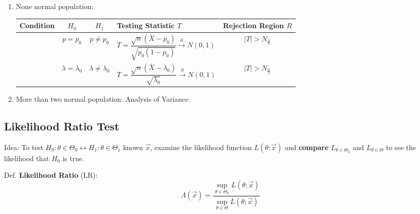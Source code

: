 \begin{enumerate}
\begin{table}[htbp]
\begin{tabularx}{\linewidth}{|c|c|c|Y|c|}
                &$\sigma_1^2\geq\sigma_2^2$&$\sigma_1^2<\sigma_2^2$&&$T>F_{n-1,m-1,\alpha}$\\
                &$\sigma_1^2\leq\sigma_2^2$&$\sigma_1^2>\sigma_2^2$&&$T<F_{n-1,m-1,1-\alpha}$\\
                \hline
        \end{tabularx}
    \end{table}

    $\sigma_1^2,\sigma_2^2$ unknown case see Welch Test in \autoref{SubSubSectionDoETwoSampleComparison}.

    \item None normal population:
    
    \begin{table}[htbp]
        \centering
        \renewcommand\arraystretch{1.7}
        \begin{tabularx}{\linewidth}{|c|c|c|Y|c|}
            \hline
            Condition&$H_0$&$H_1$&Testing Statistic $T$&Rejection Region $R$\\
            \hline
            &$p=p_0$&$p\neq p_0$&$T=\dfrac{\sqrt{n}(\bar{X}-p_0)}{\sqrt{p_0(1-p_0)}}\xrightarrow[]{\mathrm{d}}N(0,1)$&$|T|>N_\frac{\alpha}{2}$\\
            \hline
            &$\lambda=\lambda_0$&$\lambda\neq \lambda_0$&$T=\dfrac{\sqrt{n}(\bar{X}-\lambda_0)}{\sqrt{\lambda_0}}\xrightarrow[]{\mathrm{d}}N(0,1)$&$|T|>N_\frac{\alpha}{2}$\\
            \hline
        \end{tabularx}
    \end{table}
    \item More than two normal population: Analysis of Variance.
\end{enumerate}

\subsection{Likelihood Ratio Test}\label{SubSectionLRT}
    Idea: To test $H_0:\theta\in\Theta_0\longleftrightarrow H_1:\theta\in\Theta_1$ known $\vec{x}$, examine the likelihood function $L(\theta;\vec{x})$ and \textbf{compare} $L_{\theta\in\Theta_0}$ and $L_{\theta\in\Theta}$ to see the likelihood that $H_0$ is true.

    Def. \textbf{Likelihood Ratio} (LR):
    \begin{equation}
    \Lambda (\vec{x})=\dfrac{{\displaystyle\sup_{\theta\in\Theta_0}L(\theta;\vec{x})}}{{\displaystyle\sup_{\theta\in\Theta}L(\theta;\vec{x})}}
    \end{equation}

